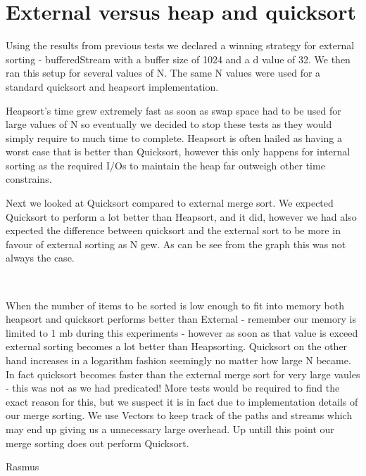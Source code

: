 \section{External versus heap and quicksort}

Using the results from previous tests we declared a winning strategy for external sorting - bufferedStream with a buffer size of 1024 and a d value of 32. We then ran this setup for several values of N. The same N values were used for a standard quicksort and heapsort implementation.

Heapsort's time grew extremely fast as soon as swap space had to be used for large values of N so eventually we decided to stop these tests as they would simply require to much time to complete. Heapsort is often hailed as having a worst case that is better than Quicksort, however this only happens for internal sorting as the required I/Os to maintain the heap far outweigh other time constrains.

Next we looked at Quicksort compared to external merge sort. We expected Quicksort to perform a lot better than Heapsort, and it did, however we had also expected the difference between quicksort and the external sort to be more in favour of external sorting as N gew. As can be see from the graph this was not always the case.

\includegraphics[width=0.5]{compare.png}

When the number of items to be sorted is low enough to fit into memory both heapsort and quicksort performs better than External - remember our memory is limited to 1 mb during this experiments - however as soon as that value is exceed external sorting becomes a lot better than Heapsorting. Quicksort on the other hand increases in a logarithm fashion seemingly no matter how large N became. In fact quicksort becomes faster than the external merge sort for very large vaules - this was not as we had predicated! More tests would be required to find the exact reason for this, but we suspect it is in fact due to implementation details of our merge sorting. We use Vectors to keep track of the paths and streams which may end up giving us a unnecessary large overhead. Up untill this point our merge sorting does out perform Quicksort.


Rasmus